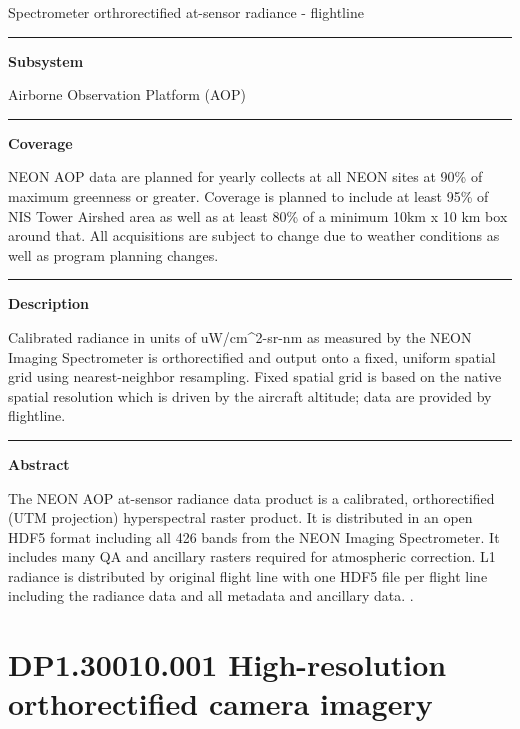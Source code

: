 \documentclass[]{article}
\begin{document}
Spectrometer orthrorectified at-sensor radiance - flightline

\begin{center}\rule{0.5\linewidth}{\linethickness}\end{center}

\textbf{Subsystem}

Airborne Observation Platform (AOP)

\begin{center}\rule{0.5\linewidth}{\linethickness}\end{center}

\textbf{Coverage}

NEON AOP data are planned for yearly collects at all NEON sites at 90\%
of maximum greenness or greater. Coverage is planned to include at least
95\% of NIS Tower Airshed area as well as at least 80\% of a minimum
10km x 10 km box around that. All acquisitions are subject to change due
to weather conditions as well as program planning changes.

\begin{center}\rule{0.5\linewidth}{\linethickness}\end{center}

\textbf{Description}

Calibrated radiance in units of uW/cm\^{}2-sr-nm as measured by the NEON
Imaging Spectrometer is orthorectified and output onto a fixed, uniform
spatial grid using nearest-neighbor resampling. Fixed spatial grid is
based on the native spatial resolution which is driven by the aircraft
altitude; data are provided by flightline.

\begin{center}\rule{0.5\linewidth}{\linethickness}\end{center}

\textbf{Abstract}

The NEON AOP at-sensor radiance data product is a calibrated,
orthorectified (UTM projection) hyperspectral raster product. It is
distributed in an open HDF5 format including all 426 bands from the NEON
Imaging Spectrometer. It includes many QA and ancillary rasters required
for atmospheric correction. L1 radiance is distributed by original
flight line with one HDF5 file per flight line including the radiance
data and all metadata and ancillary data. \newpage
.

\section{DP1.30010.001 High-resolution orthorectified camera
imagery}\label{dp1.30010.001-high-resolution-orthorectified-camera-imagery}
\end{document}
